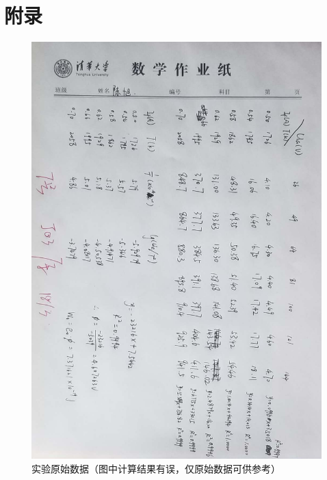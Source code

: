 \documentclass[a4paper]{article}
\begin{document}
\newpage

\section{附录}

\begin{figure}[H]
	\centering
	\includegraphics[width=0.9\linewidth]{figures/f3}
    \caption{实验原始数据（图中计算结果有误，仅原始数据可供参考）}
\end{figure}
\end{document}
